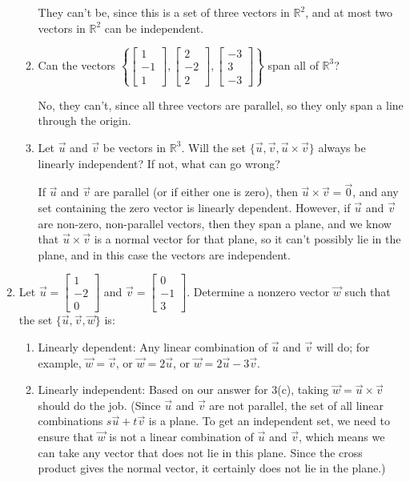 \documentclass[12pt]{article}
\newcommand{\R}{\mathbb{R}}
\newcommand{\bbm}{\begin{bmatrix}}
\newcommand{\ebm}{\end{bmatrix}}
\begin{document}
\begin{enumerate}
\begin{enumerate}
They can't be, since this is a set of three vectors in $\R^2$, and at most two vectors in $\R^2$ can be independent.

\item Can the vectors $\left\{\bbm 1\\-1\\1\ebm, \bbm 2\\-2\\2\ebm, \bbm -3\\3\\-3\ebm\right\}$ span all of $\R^3$?

No, they can't, since all three vectors are parallel, so they only span a line through the origin.

\item Let $\vec{u}$ and $\vec{v}$ be vectors in $\R^3$. Will the set $\{\vec{u},\vec{v}, \vec{u}\times\vec{v}\}$ always be linearly independent? If not, what can go wrong?

If $\vec{u}$ and $\vec{v}$ are parallel (or if either one is zero), then $\vec{u}\times \vec{v}=\vec{0}$, and any set containing the zero vector is linearly dependent. However, if $\vec{u}$ and $\vec{v}$ are non-zero, non-parallel vectors, then they span a plane, and we know that $\vec{u}\times \vec{v}$ is a normal vector for that plane, so it can't possibly lie in the plane, and in this case the vectors are independent.

\end{enumerate}

\item Let $\vec{u} = \bbm 1\\-2\\0\ebm$ and $\vec{v} = \bbm 0\\-1\\3\ebm$. Determine a nonzero vector $\vec{w}$ such that the set $\{\vec{u},\vec{v},\vec{w}\}$ is:
\begin{enumerate}
\item Linearly dependent: Any linear combination of $\vec{u}$ and $\vec{v}$ will do; for example, $\vec{w}=\vec{v}$, or $\vec{w}=2\vec{u}$, or $\vec{w}=2\vec{u}-3\vec{v}$.



\item Linearly independent: Based on our answer for 3(c), taking $\vec{w}=\vec{u}\times \vec{v}$ should do the job. (Since $\vec{u}$ and $\vec{v}$ are not parallel, the set of all linear combinations $s\vec{u}+t\vec{v}$ is a plane. To get an independent set, we need to ensure that $\vec{w}$ is not a linear combination of $\vec{u}$ and $\vec{v}$, which means we can take any vector that does not lie in this plane. Since the cross product gives the normal vector, it certainly does not lie in the plane.)


\end{enumerate}
\end{enumerate}
\end{document}
